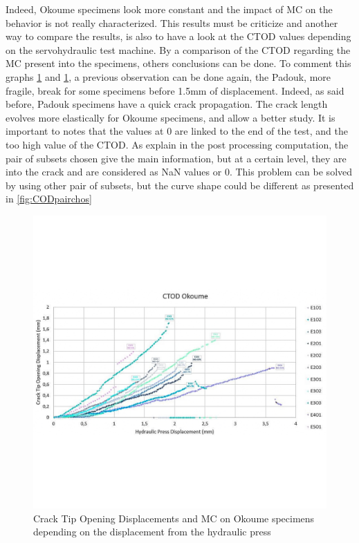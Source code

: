 Indeed, Okoume specimens look more constant and the impact of MC on the behavior is not really characterized. 
This results must be criticize and another way to compare the results, is also to have a look at the CTOD values depending on the servohydraulic test machine. By a comparison of the CTOD regarding the MC present into the specimens, others conclusions can be done. To comment this graphs \ref{fig:Res_CTOD_o} and \ref{fig:Res_CTOD_o}, a previous observation can be done again, the Padouk, more fragile, break for some specimens before 1.5\si{\milli\meter} of displacement. Indeed, as said before, Padouk specimens have a quick crack propagation. The crack length evolves more elastically for Okoume specimens, and allow a better study. It is important to notes that the values at 0 are linked to the end of the test, and the too high value of the CTOD. As explain in the post processing computation, the pair of subsets chosen give the main information, but at a certain level, they are into the crack and are considered as NaN values or 0. This problem can be solved by using other pair of subsets, but the curve shape could be different as presented in \ref{fig:CODpairchos}
\newpage
\begin{figure}
	\centering
	\includegraphics[width=\textwidth]{Figures/Res_CTOD_o}
	\decoRule
	\caption[CTOD and MC on Okoume specimens]{Crack Tip Opening Displacements and MC on Okoume specimens depending on the displacement from the hydraulic press}
	\label{fig:Res_CTOD_o}
\end{figure}
